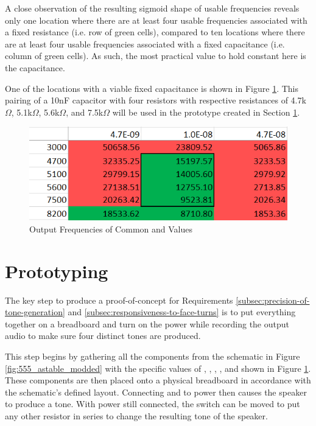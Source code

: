 A close observation of the resulting sigmoid shape of usable
frequencies reveals only one location where there are at least four
usable frequencies associated with a fixed resistance (i.e. row of
green cells), compared to ten locations where there are at least four
usable frequencies associated with a fixed capacitance (i.e. column of
green cells). As such, the most practical value to hold constant here
is the capacitance.

One of the locations with a viable fixed capacitance is shown in Figure
\ref{fig:freq-selection-r}. This pairing of a 10nF capacitor with four
resistors with respective resistances of 4.7k$\Omega$, 5.1k$\Omega$,
5.6k$\Omega$, and 7.5k$\Omega$ will be used in the prototype created in
Section \ref{sec:prototype}.

\begin{figure}[h]
    \centering
    \caption{Output Frequencies of Common  and  Values}
    \label{fig:freq-selection-r}
    \includegraphics[width=0.75\linewidth]{Figures/6 PCB Design/freq_selection_r.png}
\end{figure}


\section{Prototyping}
\label{sec:prototype}

The key step to produce a proof-of-concept for Requirements
\ref{subsec:precision-of-tone-generation} and
\ref{subsec:responsiveness-to-face-turns} is to put everything together
on a breadboard and turn on the power while recording the output audio
to make sure four distinct tones are produced.

This step begins by gathering all the components from the schematic in
Figure \ref{fig:555_astable_modded} with the specific values of
, , , , and  shown in
Figure \ref{fig:freq-selection-r}. These components are then placed
onto a physical breadboard in accordance with the schematic's defined
layout. Connecting  and  to power then causes the
speaker to produce a tone. With power still connected, the switch can
be moved to put any other resistor in series to change the resulting
tone of the speaker.


